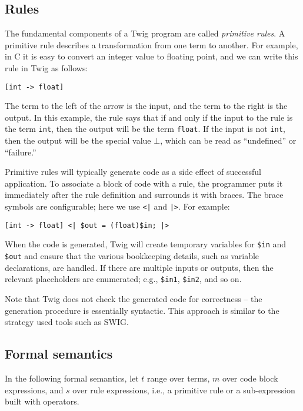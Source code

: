 \subsection{Rules}
\label{sec:rules}

The fundamental components of a Twig program are called \emph{primitive rules}. A primitive rule describes a transformation from one term to another. For example, in C it is easy to convert an integer value to floating point, and we can write this rule in Twig as follows:

\begin{verbatim}
[int -> float]
\end{verbatim}

The term to the left of the arrow is the input, and the term to the right is the output. In this example, the rule says that if and only if the input to the rule is the term \texttt{int}, then the output will be the term \texttt{float}. If the input is not \texttt{int}, then the output will be the special value $\bot$, which can be read as ``undefined'' or ``failure.''

Primitive rules will typically generate code as a side effect of successful application. To associate a block of code with a rule, the programmer puts it immediately after the rule definition and surrounds it with braces. The brace symbols are configurable; here we use \texttt{<|} and \texttt{|>}. For example:

\begin{verbatim}
[int -> float] <| $out = (float)$in; |>
\end{verbatim}

When the code is generated, Twig will create temporary variables for \texttt{\$in} and \texttt{\$out} and ensure that the various bookkeeping details, such as variable declarations, are handled. If there are multiple inputs or outputs, then the relevant placeholders are enumerated; e.g., \texttt{\$in1}, \texttt{\$in2}, and so on.

Note that Twig does not check the generated code for correctness  -- the generation procedure is essentially syntactic. This approach is similar to the strategy used tools such as SWIG\cite{swig}.

\subsection{Formal semantics}

In the following formal semantics, let $t$ range over terms, $m$ over code block expressions, and $s$ over rule expressions, i.e., a primitive rule or a sub-expression built with operators.

